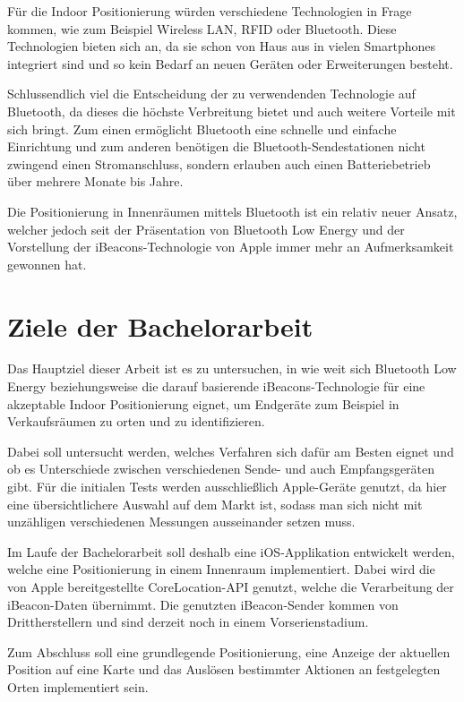 Für die Indoor Positionierung würden verschiedene Technologien in Frage kommen, wie zum Beispiel Wireless LAN, RFID oder Bluetooth.
Diese Technologien bieten sich an, da sie schon von Haus aus in vielen Smartphones integriert sind und so kein Bedarf an neuen Geräten oder Erweiterungen besteht.



Schlussendlich viel die Entscheidung der zu verwendenden Technologie auf Bluetooth, da dieses die höchste Verbreitung bietet und auch weitere Vorteile mit sich bringt. Zum einen ermöglicht Bluetooth eine schnelle und einfache Einrichtung und zum anderen benötigen die Bluetooth-Sendestationen nicht zwingend einen Stromanschluss, sondern erlauben auch einen Batteriebetrieb über mehrere Monate bis Jahre.

Die Positionierung in Innenräumen mittels Bluetooth ist ein relativ neuer Ansatz, welcher jedoch seit der Präsentation von Bluetooth Low Energy und der Vorstellung der iBeacons-Technologie von Apple immer mehr an Aufmerksamkeit gewonnen hat. 

\section{Ziele der Bachelorarbeit}
\label{sec:introduction:goal}


Das Hauptziel dieser Arbeit ist es zu untersuchen, in wie weit sich Bluetooth Low Energy beziehungsweise die darauf basierende iBeacons-Technologie für eine akzeptable Indoor Positionierung eignet, um Endgeräte zum Beispiel in Verkaufsräumen zu orten und zu identifizieren.

Dabei soll untersucht werden, welches Verfahren sich dafür am Besten eignet und ob es Unterschiede zwischen verschiedenen Sende- und auch Empfangsgeräten gibt.
Für die initialen Tests werden ausschließlich Apple-Geräte genutzt, da hier eine übersichtlichere Auswahl auf dem Markt ist, sodass man sich nicht mit unzähligen verschiedenen Messungen ausseinander setzen muss. 

Im Laufe der Bachelorarbeit soll deshalb eine iOS-Applikation entwickelt werden, welche eine Positionierung in einem Innenraum implementiert. Dabei wird die von Apple bereitgestellte CoreLocation-API genutzt, welche die Verarbeitung der iBeacon-Daten übernimmt. Die genutzten iBeacon-Sender kommen von Drittherstellern und sind derzeit noch in einem Vorserienstadium. 

Zum Abschluss soll eine grundlegende Positionierung, eine Anzeige der aktuellen Position auf eine Karte und das Auslösen bestimmter Aktionen an festgelegten Orten implementiert sein.



